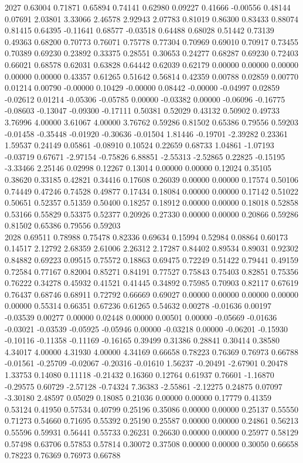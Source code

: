 {2027 0.63004 0.71871 0.65894 0.74141 0.62980 0.09227 0.41666 -0.00556 0.48144 0.07691 2.03801 3.33066 2.46578 2.92943 2.07783 0.81019 0.86300 0.83433 0.88074 0.81415 0.64395 -0.11641 0.68577 -0.03518 0.64488 0.68028 0.51442 0.73139 0.49363 0.68200 0.70773 0.76071 0.75778 0.77304 0.70969 0.69010 0.70917 0.73455 0.70389 0.69230 0.23892 0.33375 0.28551 0.30653 0.24277 0.68287 0.69230 0.72403 0.66021 0.68578 0.62031 0.63828 0.64442 0.62039 0.62179 0.00000 0.00000 0.00000 0.00000 0.00000 0.43357 0.61265 0.51642 0.56814 0.42359 0.00788 0.02859 0.00770 0.01214 0.00790 -0.00000 0.10429 -0.00000 0.08442 -0.00000 -0.04997 0.02859 -0.02612 0.01214 -0.05306 -0.05785 0.00000 -0.03382 0.00000 -0.06096 -0.16775 -0.08603 -0.13047 -0.09300 -0.17111 0.50381 0.52029 0.43132 0.50902 0.49733 3.76996 4.00000 3.61067 4.00000 3.76762 0.59286 0.81502 0.65386 0.79556 0.59203 -0.01458 -0.35448 -0.01920 -0.30636 -0.01504 1.81446 -0.19701 -2.39282 0.23361 1.59537 0.24149 0.05861 -0.08910 0.10524 0.22659 0.68733 1.04861 -1.07193 -0.03719 0.67671 -2.97154 -0.75826 6.88851 -2.55313 -2.52865 0.22825 -0.15195 -3.33466 2.25146 0.02998 0.12267 0.13014 0.00000 0.00000 0.12024 0.35105 0.38620 0.33185 0.42821 0.34416 0.17608 0.26039 0.00000 0.00000 0.17574 0.50106 0.74449 0.47246 0.74528 0.49877 0.17434 0.18084 0.00000 0.00000 0.17142 0.51022 0.50651 0.52357 0.51359 0.50400 0.18257 0.18912 0.00000 0.00000 0.18018 0.52858 0.53166 0.55829 0.53375 0.52377 0.20926 0.27330 0.00000 0.00000 0.20866 0.59286 0.81502 0.65386 0.79556 0.59203 \\
2028 0.69511 0.78988 0.75478 0.82336 0.69634 0.15994 0.52984 0.08864 0.60173 0.14517 2.12792 2.68359 2.61006 2.26312 2.17287 0.84402 0.89534 0.89031 0.92302 0.84882 0.69223 0.09515 0.75572 0.18863 0.69475 0.72249 0.51422 0.79441 0.49159 0.72584 0.77167 0.82004 0.85271 0.84191 0.77527 0.75843 0.75403 0.82851 0.75356 0.76222 0.34278 0.45932 0.41521 0.41445 0.34892 0.75985 0.70903 0.82117 0.67619 0.76437 0.68746 0.68911 0.72792 0.66669 0.69027 0.00000 0.00000 0.00000 0.00000 0.00000 0.55314 0.66351 0.67236 0.61265 0.54632 0.00278 -0.01636 0.00197 -0.03539 0.00277 0.00000 0.02448 0.00000 0.00501 0.00000 -0.05669 -0.01636 -0.03021 -0.03539 -0.05925 -0.05946 0.00000 -0.03218 0.00000 -0.06201 -0.15930 -0.10116 -0.11358 -0.11169 -0.16165 0.39499 0.31386 0.28841 0.30414 0.38580 4.34017 4.00000 4.31930 4.00000 4.34169 0.66658 0.78223 0.76369 0.76973 0.66788 -0.01561 -0.25709 -0.02067 -0.20316 -0.01610 1.56237 -0.20491 -2.67901 0.20478 1.33753 0.14080 0.11118 -0.21432 0.16360 0.12764 0.61937 0.76601 -1.16870 -0.29575 0.60729 -2.57128 -0.74324 7.36383 -2.55861 -2.12275 0.24875 0.07097 -3.30180 2.48597 0.05029 0.18085 0.21036 0.00000 0.00000 0.17779 0.41359 0.53124 0.41950 0.57534 0.40799 0.25196 0.35086 0.00000 0.00000 0.25137 0.55550 0.71273 0.54660 0.71695 0.55392 0.25190 0.25587 0.00000 0.00000 0.24861 0.56213 0.55596 0.59931 0.56441 0.55733 0.26231 0.26630 0.00000 0.00000 0.25977 0.58129 0.57498 0.63706 0.57853 0.57814 0.30072 0.37508 0.00000 0.00000 0.30050 0.66658 0.78223 0.76369 0.76973 0.66788 \\
}
